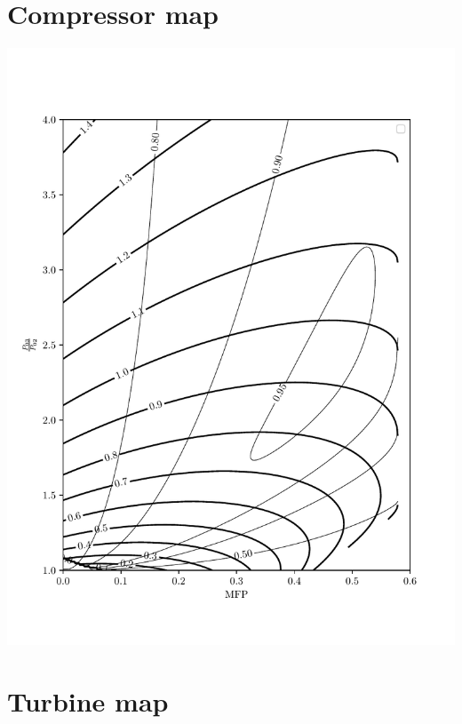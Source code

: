 \documentclass[tcc]{subfiles}
\begin{document}
\begin{enumerate}
\section{Compressor map}
\includegraphics{src/mapv1.pdf}
\section{Turbine map}

\end{enumerate}
\end{document}

